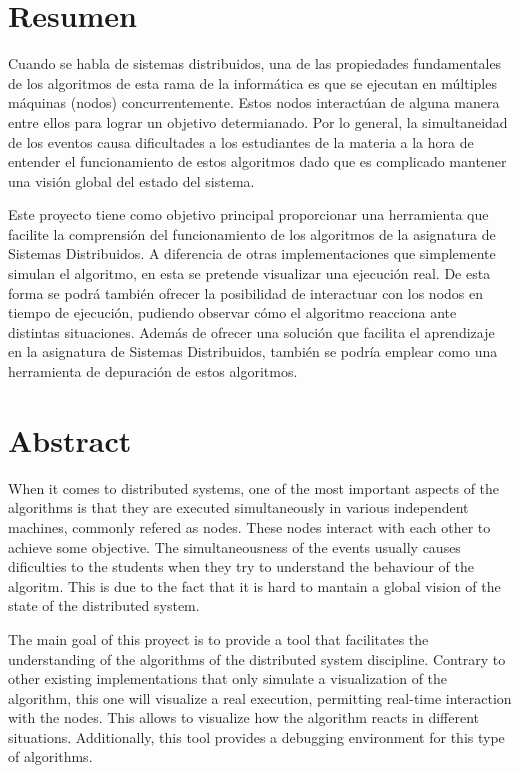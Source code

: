 \chapter*{Resumen}

Cuando se habla de sistemas distribuidos, una de las propiedades fundamentales de los algoritmos de esta rama de la informática es que se ejecutan en múltiples máquinas (nodos) concurrentemente. Estos nodos interactúan de alguna manera entre ellos para lograr un objetivo determianado. Por lo general, la simultaneidad de los eventos causa dificultades a los estudiantes de la materia a la hora de entender el funcionamiento de estos algoritmos dado que es complicado mantener una visión global del estado del sistema.

Este proyecto tiene como objetivo principal proporcionar una herramienta que facilite la comprensión del funcionamiento de los algoritmos de la asignatura de Sistemas Distribuidos. A diferencia de otras implementaciones que simplemente simulan el algoritmo, en esta se pretende visualizar una ejecución real. De esta forma se podrá también ofrecer la posibilidad de interactuar con los nodos en tiempo de ejecución, pudiendo observar cómo el algoritmo reacciona ante distintas situaciones. Además de ofrecer una solución que facilita el aprendizaje en la asignatura de Sistemas Distribuidos, también se podría emplear como una herramienta de depuración de estos algoritmos.

\newpage

\chapter*{Abstract}

When it comes to distributed systems, one of the most important aspects of the algorithms is that they are executed simultaneously in various independent machines, commonly refered as nodes. These nodes interact with each other to achieve some objective. The simultaneousness of the events usually causes dificulties to the students when they try to understand the behaviour of the algoritm. This is due to the fact that it is hard to mantain a global vision of the state of the distributed system.

The main goal of this proyect is to provide a tool that facilitates the understanding of the algorithms of the distributed system discipline. Contrary to other existing implementations that only simulate a visualization of the algorithm, this one will visualize a real execution, permitting real-time interaction with the nodes. This allows to visualize how the algorithm reacts in different situations. Additionally, this tool provides a debugging environment for this type of algorithms.


